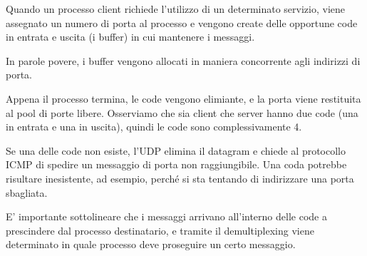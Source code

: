             Quando un processo client richiede l'utilizzo di un determinato servizio, viene assegnato un numero di porta al processo e vengono create delle opportune code in entrata e uscita (i buffer) in cui mantenere i messaggi.
            
            In parole povere, i buffer vengono allocati in maniera concorrente agli indirizzi di porta.
            
            Appena il processo termina, le code vengono elimiante, e la porta viene restituita al pool di porte libere. Osserviamo che sia client che server hanno due code (una in entrata e una in uscita), quindi le code sono complessivamente 4.
            
            \vspace{3mm}
            
            Se una delle code non esiste, l'UDP elimina il datagram e chiede al protocollo ICMP di spedire un messaggio di porta non raggiungibile. Una coda potrebbe risultare inesistente, ad esempio, perché si sta tentando di indirizzare una porta sbagliata.
             
            E' importante sottolineare che i messaggi arrivano all'interno delle code a prescindere dal processo destinatario, e tramite il demultiplexing viene determinato in quale processo deve proseguire un certo messaggio.
